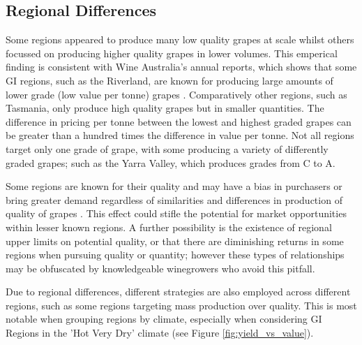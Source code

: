 \documentclass[review,12pt,authoryear]{elsarticle}
\begin{document}
\begin{linenumbers}
\subsection{Regional Differences}
Some regions appeared to produce many low quality grapes at scale whilst others focussed on producing higher quality grapes in lower volumes. This emperical finding is consistent with Wine Australia's annual reports, which shows that some GI regions, such as the Riverland, are known for producing large amounts of lower grade (low value per tonne) grapes \cite{wineaustraliaNationalVintageReport2022,winemakersfederationofaustraliaNationalVintageReport2017}. Comparatively other regions, such as Tasmania, only produce high quality grapes but in smaller quantities. The difference in pricing per tonne between the lowest and highest graded grapes can be greater than a hundred times the difference in value per tonne.
Not all regions target only one grade of grape, with some producing a variety of differently graded grapes; such as the Yarra Valley, which produces grades from C to A.
\par
Some regions are known for their quality and may have a bias in purchasers or bring greater demand regardless of similarities and differences in production of quality of grapes \citep{hallidayAustralianWineEncyclopedia2009}. 
This effect could stifle the potential for market opportunities within lesser known regions. A further possibility is the existence of regional upper limits on potential quality, or that there are diminishing returns in some regions when pursuing quality or quantity; however these types of relationships may be obfuscated by knowledgeable winegrowers who avoid this pitfall.
%
\par
Due to regional differences, different strategies are also  employed across different regions, such as some regions targeting mass production over quality. This is most notable when grouping regions by climate, especially when considering GI Regions in the 'Hot Very Dry' climate (see Figure \ref{fig:yield_vs_value}). 

\end{linenumbers}
\end{document}
